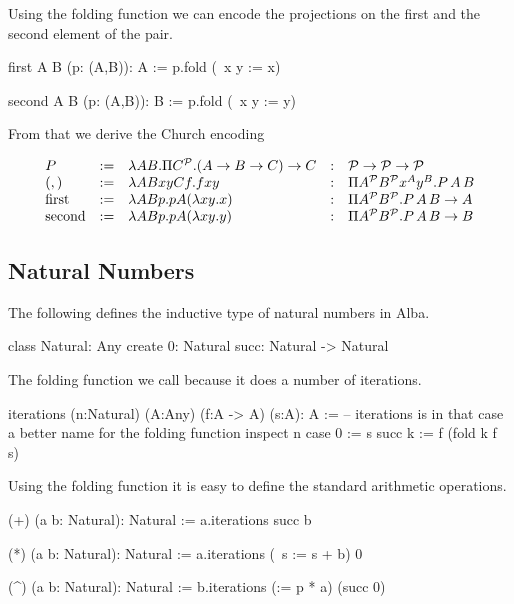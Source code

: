 Using the folding function we can encode the projections on the first and the
second element of the pair.
\begin{alba}
  first A B (p: (A,B)): A :=
     p.fold (\ x y := x)

  second A B (p: (A,B)): B :=
     p.fold (\ x y := y)
\end{alba}

From that we derive the Church encoding

$$
\begin{array}{lllll}
  P & :=
  & \lambda A B . \Pi C^{\cal{P}} . (A \to B \to C) \to C
  &:
  & {\cal{P}} \to {\cal{P}} \to {\cal{P}}
  \\
  (,) &:=
  & \lambda A B x y C f . f x y
  &: & \Pi A^{\cal{P}} B^{\cal{P}} x^A y^B.  P \, A \, B
  \\
  \text{first} &:=
  & \lambda A B p . p A (\lambda x y. x)
  &: & \Pi A^{\cal{P}} B^{\cal{P}}. P\, A\, B \to A
  \\
  \text{second} &:=
  & \lambda A B p . p A (\lambda x y. y)
  &: & \Pi A^{\cal{P}} B^{\cal{P}}. P\, A\, B \to B
\end{array}
$$






\subsection{Natural Numbers}


The following defines the inductive type of natural numbers in Alba.
\begin{alba}
  class Natural: Any create
    0: Natural
    succ: Natural -> Natural
\end{alba}

The folding function we call  because it does a number of
iterations.

\begin{alba}
  iterations (n:Natural) (A:Any) (f:A -> A) (s:A): A :=
      -- iterations is in that case a better name for the folding function
    inspect n case
      0 :=
        s
      succ k :=
        f (fold k f s)
\end{alba}

Using the folding function it is easy to define the standard arithmetic
operations.


\begin{alba}
  (+) (a b: Natural): Natural :=
    a.iterations succ b

  (*) (a b: Natural): Natural :=
    a.iterations (\ s := s + b) 0

  (^) (a b: Natural): Natural :=
    b.iterations (\p := p * a) (succ 0)
\end{alba}

